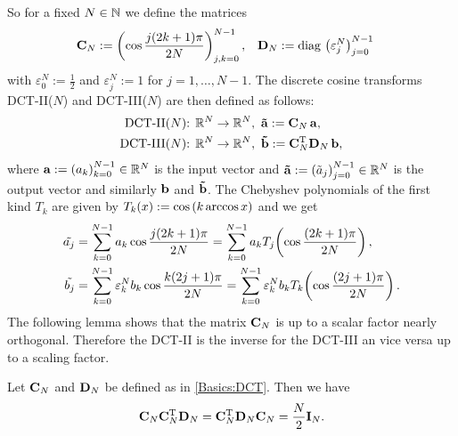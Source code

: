 So for a fixed $N \in \mathbb{N}$ we define the matrices
\begin{align}
  \nonumber
  \mathbf{C}_{N} & := \left(\cos \frac{j(2k+1) \pi}{2N}\right)_{j,k = 0}^{N-1}, & \mathbf{D}_N & := \text{\rm{diag}}\, \left(\varepsilon_j^N\right)_{j = 0}^{N-1}
\end{align}
with $\varepsilon_0^N := \frac{1}{2}$ and $\varepsilon_j^N := 1$ for $j = 1,\ldots,N-1$.
The discrete cosine transforms DCT-II($N$) and DCT-III($N$) are then defined as follows:
\begin{equation}
  \label{Basics:DCT}
  \begin{split}
    \text{DCT-II($N$): } & \mathbb{R}^N \rightarrow \mathbb{R}^N,\ \mathbf{\tilde{a}} := \mathbf{C}_N\, \mathbf{a},\\
    \text{DCT-III($N$): } & \mathbb{R}^N \rightarrow \mathbb{R}^N,\ \mathbf{\tilde{b}} := \mathbf{C}_N^{\text{\rm{T}}} \mathbf{D}_N\, \mathbf{b}, 
  \end{split}  
\end{equation}
where $\mathbf{a} := \left(a_k\right)_{k=0}^{N-1} \in \mathbb{R}^N$ is the input vector and $\mathbf{\tilde{a}} := 
\left(\tilde{a}_j\right)_{j=0}^{N-1} \in \mathbb{R}^N$ is the output vector and similarly $\mathbf{b}$ and $\mathbf{\tilde{b}}$. 
The Chebyshev polynomials of the first kind $T_{k}$ are given by $T_{k}{\hspace{-0.4ex}}\left(x\right) := \cos{\hspace{-0.4ex}}\left(k \arccos x\right)$ 
and we get
\begin{equation}
  \label{Basics:DCT2}
  \begin{split}
    \tilde{a_{j}} & = \sum_{k = 0}^{N-1} a_{k} \cos \frac{j(2k+1)\pi}{2N} = \sum_{k = 0}^{N-1} a_{k} T_{j}{\hspace{-0.4ex}}\left(\cos \frac{(2k+1) \pi}{2N}\right),\\
    \tilde{b_{j}} & = \sum_{k = 0}^{N-1} \varepsilon_k^N b_{k} \cos \frac{k(2j+1)\pi}{2N} = \sum_{k = 0}^{N-1} \varepsilon_k^N b_{k} T_{k}{\hspace{-0.4ex}}\left(\cos \frac{(2j+1) \pi}{2N}\right).
  \end{split}  
\end{equation}
The following lemma shows that the matrix $\mathbf{C}_N$ is up to a scalar factor nearly orthogonal. Therefore the DCT-II is the inverse for the DCT-III an vice versa up to a scaling factor.
\begin{lemma}
  \label{Basics:DCT3}
  Let $\mathbf{C}_N$ and $\mathbf{D}_N$ be defined as in \eqref{Basics:DCT}. Then we have
  $$ \mathbf{C}_N\mathbf{C}_N^{\text{\rm{T}}}\mathbf{D}_N = \mathbf{C}_N^{\text{\rm{T}}}\mathbf{D}_N\mathbf{C}_N = \frac{N}{2} \mathbf{I}_{N}. $$
\end{lemma}

